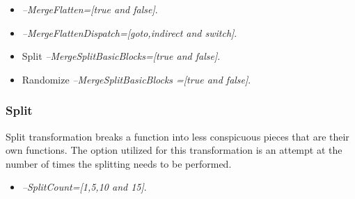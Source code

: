 \begin{itemize}
\item \textit{--MergeFlatten=[true and false]}.
\item \textit{--MergeFlattenDispatch=[goto,indirect and switch]}.
\item Split \textit{--MergeSplitBasicBlocks=[true and false]}.
\item Randomize \textit{--MergeSplitBasicBlocks	=[true and false]}.
\end{itemize}


\subsubsection{Split}
Split transformation breaks a function into less conspicuous pieces that are their own functions. The option utilized for this transformation is an attempt at the number of times the splitting needs to be performed. 

\begin{itemize}
\item \textit{--SplitCount=[1,5,10 and 15]}.
\end{itemize}

